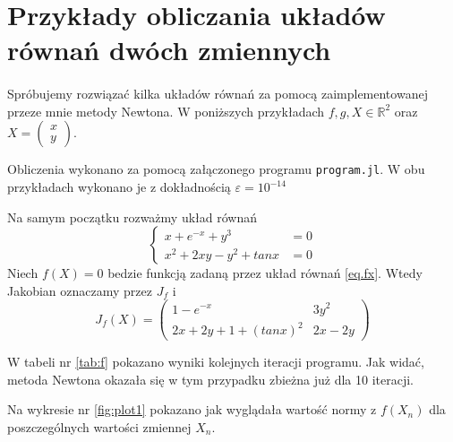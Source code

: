 \documentclass{article}
\begin{document}
  \section{Przykłady obliczania układów równań dwóch zmiennych}
    \paragraph{} Spróbujemy rozwiązać kilka układów równań za pomocą zaimplementowanej
    przeze mnie metody Newtona. W poniższych przykładach $f, g, X \in \mathbb{R}^2$ oraz
    $X = \begin{pmatrix} x \\ y \end{pmatrix}$.

    Obliczenia wykonano za pomocą załączonego programu \texttt{program.jl}.
    W obu przykładach wykonano je z dokładnością $\varepsilon = 10^{-14}$

    Na samym początku rozważmy układ równań
    \begin{equation}\label{eq.fx}
      \begin{cases}
        x + e^{-x} + y^3        &= 0 \\
        x^2 + 2xy - y^2 + tan x &= 0
      \end{cases}
    \end{equation}
    Niech $f(X) = 0$ bedzie funkcją zadaną przez układ równań \eqref{eq.fx}.
    Wtedy Jakobian oznaczamy przez $J_f$ i
    \begin{equation*}
      J_{f}(X) =
      \begin{pmatrix}
        1 - e^{-x}              & 3y^2    \\
        2x + 2y + 1 + (tan x)^2 & 2x - 2y
      \end{pmatrix}
    \end{equation*}

    W tabeli nr \ref{tab:f} pokazano wyniki kolejnych iteracji programu. Jak widać,
    metoda Newtona okazała się w tym przypadku zbieżna już dla 10 iteracji.

    Na wykresie nr \ref{fig:plot1} pokazano jak wyglądała wartość normy z $f(X_n)$
    dla poszczególnych wartości zmiennej $X_n$.
\end{document}
